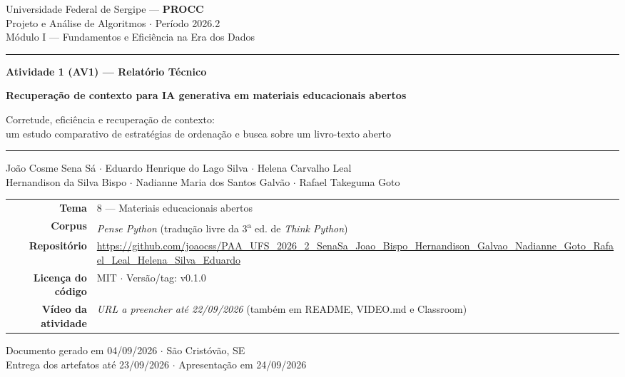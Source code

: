 \documentclass[11pt,a4paper]{article}
\begin{document}
\begin{titlepage}
\thispagestyle{empty}
\centering
\vspace*{0.6cm}
{\normalsize\color{cinza}
Universidade Federal de Sergipe --- \textbf{\color{azul}PROCC}\\[2pt]
Projeto e Análise de Algoritmos $\cdot$ Período 2026.2\\[2pt]
Módulo I --- Fundamentos e Eficiência na Era dos Dados\par}

\vfill
{\color{laranja}\rule{0.7\textwidth}{2pt}}\par
\vspace{10pt}
{\large\color{laranja}\textbf{Atividade 1 (AV1) --- Relatório Técnico}}\par
\vspace{14pt}
{\Huge\bfseries\color{azul} Recuperação de contexto para IA generativa em materiais educacionais abertos\par}
\vspace{10pt}
{\large\color{cinza} Corretude, eficiência e recuperação de contexto:\\
um estudo comparativo de estratégias de ordenação e busca sobre um livro-texto aberto\par}
\vspace{8pt}
{\color{azul}\rule{0.7\textwidth}{2pt}}\par

\vspace{20pt}
{\large
João Cosme Sena Sá $\cdot$ Eduardo Henrique do Lago Silva $\cdot$ Helena Carvalho Leal\\[4pt]
Hernandison da Silva Bispo $\cdot$ Nadianne Maria dos Santos Galvão $\cdot$ Rafael Takeguma Goto\par}

\vspace{18pt}
\begin{tabular}{@{}r@{\quad}l@{}}
\textbf{Tema}            & 8 --- Materiais educacionais abertos\\
\textbf{Corpus}          & \emph{Pense Python} (tradução livre da 3\textsuperscript{a} ed. de \emph{Think Python})\\
\textbf{Repositório}     & \small\url{https://github.com/joaocss/PAA_UFS_2026_2_SenaSa_Joao_Bispo_Hernandison_Galvao_Nadianne_Goto_Rafael_Leal_Helena_Silva_Eduardo}\\
\textbf{Licença do código} & MIT $\cdot$ Versão/tag: v0.1.0\\
\textbf{Vídeo da atividade} & \emph{URL a preencher até 22/09/2026} (também em README, VIDEO.md e Classroom)\\
\end{tabular}

\vfill
{\footnotesize\color{cinza}
Documento gerado em 04/09/2026 $\cdot$ São Cristóvão, SE\\
Entrega dos artefatos até 23/09/2026 $\cdot$ Apresentação em 24/09/2026\par}
\end{titlepage}
\end{document}
